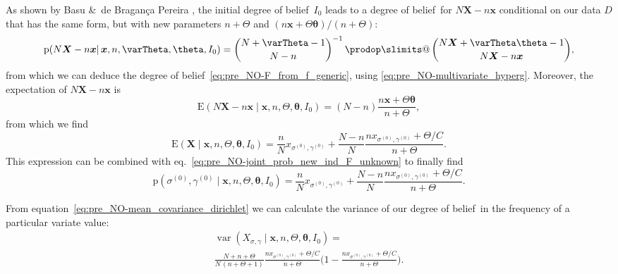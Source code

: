 \documentclass[\ifafour a4paper,12pt,\else a5paper,10pt,\fi%
onecolumn,oneside,article,%
british%
]{memoir}
\makeatletter
\theoremstyle{remark}
\theoremstyle{innote}
\def\prod{\DOTSI\prodop\slimits@}
\newcommand*{\citey}{\parencites*}
\newcommand*{\amp}{\&}
\newcommand*{\pf}{\mathrm{p}}%
\renewcommand*{\|}{\mathpunct{|}}
\newcommand*{\sect}{\S}%
\newcommand*{\eqn}{eq.}%
\newcommand*{\tprod}{\mathop{\textstyle\prod}\nolimits}
\newcommand*{\E}{\mathrm{E}}
\DeclareMathOperator{\var}{var}
\newcommand*{\dob}{degree of belief}
\newcommand*{\yD}{D}
\newcommand*{\yprod}{\tprod}
\newcommand*{\ys}{\sigma}
\newcommand*{\yg}{\gamma}
\newcommand*{\ysi}[1]{\ys^{(#1)}}
\newcommand*{\ygi}[1]{\yg^{(#1)}}
\newcommand*{\yso}{\ysi{0}}
\newcommand*{\ygo}{\ygi{0}}
\newcommand*{\yF}{\bm{X}}
\newcommand*{\yf}{\bm{x}}
\newcommand*{\yIo}{I_{0}}
\newcommand*{\yA}{\varTheta}
\newcommand*{\ya}{\bm{\theta}}
\makeatother
\begin{document}

As shown by Basu \amp\ de Bragan\c{c}a Pereira \citey[\sect~4,
Theorem~2]{basuetal1982}, the initial \dob\ $\yIo$ leads to a \dob\ for
$N\yF-n\yf$ conditional on our data $\yD$ that has the same form, but with
new parameters $n+\yA$ and $(n\yf+\yA\ya)/(n+\yA)$:
\begin{equation}
  \label{eq:pre_NO-dirichlet_posterior_X}
  \pf(N\yF -n\yf \| \yf, n, \yA, \ya,\yIo) =
  \binom{N+\yA-1}{N-n}^{-1} \yprod\binom{N\yF+\yA\ya-1}{N\yF-n\yf},
\end{equation}
from which we can deduce the \dob~\eqref{eq:pre_NO-F_from_f_generic}, using
\eqref{eq:pre_NO-multivariate_hyperg}. Moreover, the expectation of $N\yF-n\yf$ is
\citey[\sect~3]{basuetal1982}
\begin{equation}
  \label{eq:pre_NO-dirichlet_posterior_expectation}
  \E(N\yF -n\yf \| \yf, n, \yA, \ya,\yIo) =
  (N-n) \frac{n\yf+\yA\ya}{n+\yA},
\end{equation}
from which we find
\begin{equation}
    \label{eq:pre_NO-expect_freq_dirichlet_prior_final}
    \E(\yF \| \yf, n,\yA,\ya, \yIo)  =
    \frac{n}{N}x_{\yso, \ygo} + \frac{N-n}{N}
\frac{n x_{\yso, \ygo}+\yA/C}{n+\yA}.
\end{equation}
This expression can be combined with
\eqn~\eqref{eq:pre_NO-joint_prob_new_ind_F_unknown} to finally find
\begin{equation}
    \label{eq:pre_NO-joint_prob_new_ind_full_dirichlet_prior_final}
    \pf(\yso, \ygo \| \yf, n,\yA,\ya, \yIo)  =
    \frac{n}{N}x_{\yso, \ygo} + \frac{N-n}{N}
\frac{n x_{\yso, \ygo}+\yA/C}{n+\yA}.
\end{equation}

From equation~\eqref{eq:pre_NO-mean_covariance_dirichlet} we can calculate the
variance of our \dob\ in the frequency of a particular variate value:
\begin{multline}
  \label{eq:pre_NO-variance_single_gene_dirichlet}
  \var(X_{\ys,\yg} \| \yf, n,\yA,\ya, \yIo)  ={}\\
  \frac{N+n+\yA}{N\,(n+\yA+1)}
  \frac{n x_{\yso, \ygo}+\yA/C}{n+\yA}
  \Biggl(1- \frac{n x_{\yso, \ygo}+\yA/C}{n+\yA} \Biggr).
\end{multline}
\end{document}
